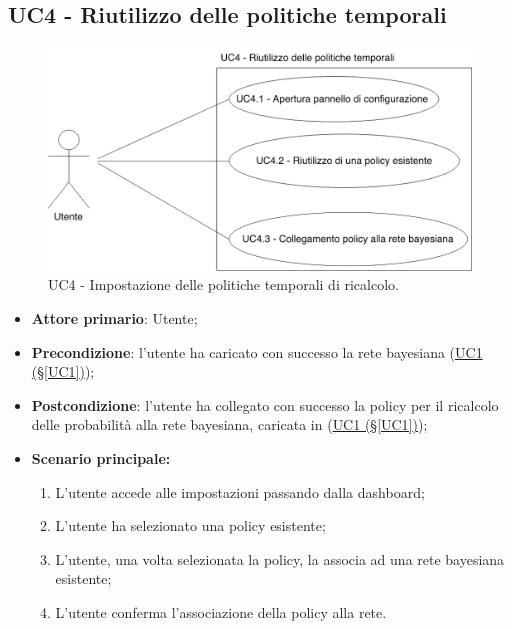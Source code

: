\newpage

\subsection{UC4 - Riutilizzo delle politiche temporali}
\label{UC4}

\begin{figure}[H]
\centering
\includegraphics[scale=0.3]{./images/UC4.png}
\caption{UC4 - Impostazione delle politiche temporali di ricalcolo.}
\end{figure}

\begin{itemize}
	\item \textbf{Attore primario}: Utente; 
	\item \textbf{Precondizione}: l'utente ha caricato con successo la rete bayesiana (\hyperref[UC1]{UC1 (§\ref*{UC1})});
	\item \textbf{Postcondizione}: l'utente ha collegato con successo la policy per il ricalcolo delle probabilità alla rete bayesiana, caricata in (\hyperref[UC1]{UC1 (§\ref*{UC1})});	

	\item \textbf{Scenario principale:}
		
	\begin{enumerate}
		\item L'utente accede alle impostazioni passando dalla dashboard; 
		\item L'utente ha selezionato una policy esistente; 
		\item L'utente, una volta selezionata la policy, la associa ad una rete bayesiana esistente; 
		\item L'utente conferma l'associazione della policy alla rete. 	
	\end{enumerate}
	
\end{itemize}

